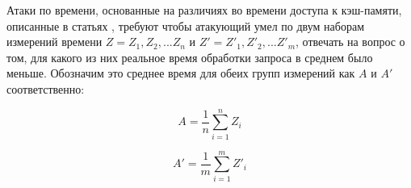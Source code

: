 Атаки по времени, основанные на различиях во времени доступа к кэш-памяти,
описанные в статьях \cite{bernstein} \cite{anmodel} \cite{remote-aes},
требуют чтобы атакующий умел по двум наборам измерений времени
$Z = {Z_1, Z_2, ... Z_n}$ и $Z' = {Z'_1, Z'_2, ... Z'_m}$, отвечать
на вопрос о том, для какого из них реальное время обработки запроса в среднем
было меньше. Обозначим это среднее время для обеих групп измерений
как $A$ и $A'$ соответственно:

\begin{equation}
A = \frac{1}{n} \sum_{i=1}^n Z_i
\end{equation}

\begin{equation}
A' = \frac{1}{m} \sum_{i=1}^m Z'_i
\end{equation}

\clearpage

